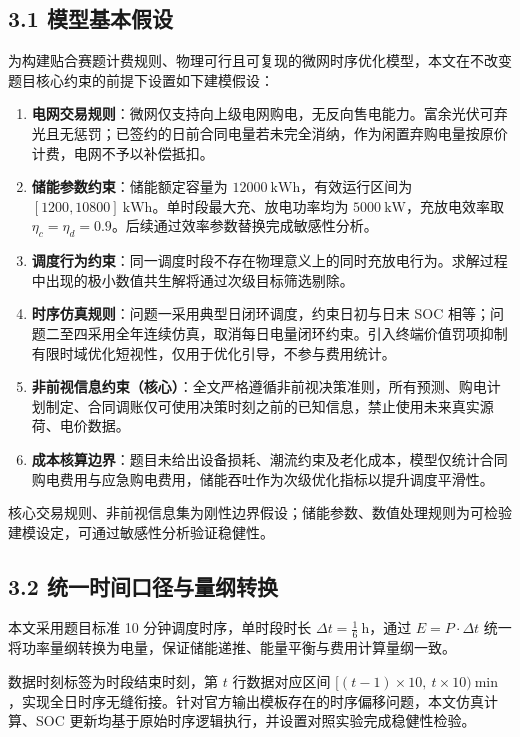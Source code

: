 
\subsection{3.1 模型基本假设}
为构建贴合赛题计费规则、物理可行且可复现的微网时序优化模型，本文在不改变题目核心约束的前提下设置如下建模假设：

\begin{enumerate}
    \item \textbf{电网交易规则}：微网仅支持向上级电网购电，无反向售电能力。富余光伏可弃光且无惩罚；已签约的日前合同电量若未完全消纳，作为闲置弃购电量按原价计费，电网不予以补偿抵扣。
    \item \textbf{储能参数约束}：储能额定容量为 $12000\ \mathrm{kWh}$，有效运行区间为 $[1200,10800]\ \mathrm{kWh}$。单时段最大充、放电功率均为 $5000\ \mathrm{kW}$，充放电效率取 $\eta_c=\eta_d=0.9$。后续通过效率参数替换完成敏感性分析。
    \item \textbf{调度行为约束}：同一调度时段不存在物理意义上的同时充放电行为。求解过程中出现的极小数值共生解将通过次级目标筛选剔除。
    \item \textbf{时序仿真规则}：问题一采用典型日闭环调度，约束日初与日末 SOC 相等；问题二至四采用全年连续仿真，取消每日电量闭环约束。引入终端价值罚项抑制有限时域优化短视性，仅用于优化引导，不参与费用统计。
    \item \textbf{非前视信息约束（核心）}：全文严格遵循非前视决策准则，所有预测、购电计划制定、合同调账仅可使用决策时刻之前的已知信息，禁止使用未来真实源荷、电价数据。
    \item \textbf{成本核算边界}：题目未给出设备损耗、潮流约束及老化成本，模型仅统计合同购电费用与应急购电费用，储能吞吐作为次级优化指标以提升调度平滑性。
\end{enumerate}

核心交易规则、非前视信息集为刚性边界假设；储能参数、数值处理规则为可检验建模设定，可通过敏感性分析验证稳健性。

\subsection{3.2 统一时间口径与量纲转换}
本文采用题目标准 10 分钟调度时序，单时段时长 $\Delta t=\displaystyle\frac{1}{6}\ \mathrm{h}$，通过 $E=P\cdot\Delta t$ 统一将功率量纲转换为电量，保证储能递推、能量平衡与费用计算量纲一致。

数据时刻标签为时段结束时刻，第 $t$ 行数据对应区间 $[(t-1)\times10,\ t\times10)\ \mathrm{min}$，实现全日时序无缝衔接。针对官方输出模板存在的时序偏移问题，本文仿真计算、SOC 更新均基于原始时序逻辑执行，并设置对照实验完成稳健性检验。

